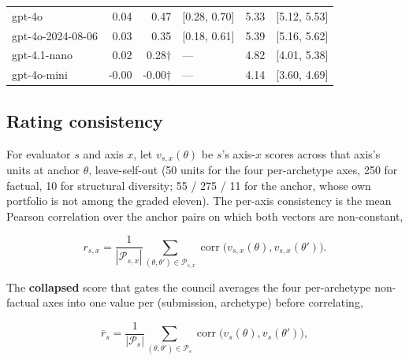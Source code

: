 \documentclass{article}
\begin{document}
\begin{table}[H]
\begin{center}
{\begin{tabular}{@{}lrrlrl@{}}
gpt-4o &\cellcolor[HTML]{F9FDCC}\textcolor[HTML]{1A1A1A}{0.04}&\cellcolor[HTML]{F8FCCA}\textcolor[HTML]{1A1A1A}{0.47}& {[}0.28, 0.70{]} &\cellcolor[HTML]{37ACC3}\textcolor[HTML]{EEF3F8}{5.33}& {[}5.12, 5.53{]}  \\
gpt-4o-2024-08-06 &\cellcolor[HTML]{FBFDCF}\textcolor[HTML]{1A1A1A}{0.03}&\cellcolor[HTML]{FAFDCE}\textcolor[HTML]{1A1A1A}{0.35}& {[}0.18, 0.61{]} &\cellcolor[HTML]{36AAC3}\textcolor[HTML]{EEF3F8}{5.39}& {[}5.16, 5.62{]}  \\
gpt-4.1-nano &\cellcolor[HTML]{FCFED3}\textcolor[HTML]{1A1A1A}{0.02}&\cellcolor[HTML]{FBFDD0}\textcolor[HTML]{1A1A1A}{0.28\ensuremath{\dagger}}& --- &\cellcolor[HTML]{4AB9C3}\textcolor[HTML]{1A1A1A}{4.82}& {[}4.01, 5.38{]}  \\
gpt-4o-mini &\cellcolor[HTML]{FFFFD9}\textcolor[HTML]{1A1A1A}{-0.00}&\cellcolor[HTML]{FFFFD9}\textcolor[HTML]{1A1A1A}{-0.00\ensuremath{\dagger}}& --- &\cellcolor[HTML]{6CC6BE}\textcolor[HTML]{1A1A1A}{4.14}& {[}3.60, 4.69{]}  \\
\bottomrule
\end{tabular}}
\end{center}
\end{table}

\subsection{Rating consistency}\label{rating-consistency}

For evaluator \(s\) and axis \(x\), let \(v_{s,x}(\theta)\) be \(s\)'s axis-\(x\) scores across that axis's units at anchor \(\theta\), leave-self-out (50 units for the four per-archetype axes, 250 for factual, 10 for structural diversity; 55 / 275 / 11 for the anchor, whose own portfolio is not among the graded eleven). The per-axis consistency is the mean Pearson correlation over the anchor pairs on which both vectors are non-constant,

\[ r_{s,x}=\frac{1}{|\mathcal P_{s,x}|}\sum_{(\theta,\theta')\in\mathcal P_{s,x}}\operatorname{corr}\!\big(v_{s,x}(\theta),v_{s,x}(\theta')\big). \tag{A10}\]

The \textbf{collapsed} score that gates the council averages the four per-archetype non-factual axes into one value per (submission, archetype) before correlating,

\[ \bar r_s=\frac{1}{|\mathcal P_{s}|}\sum_{(\theta,\theta')\in\mathcal P_{s}}\operatorname{corr}\!\big(v_{s}(\theta),v_{s}(\theta')\big), \tag{A11}\]
\end{document}

